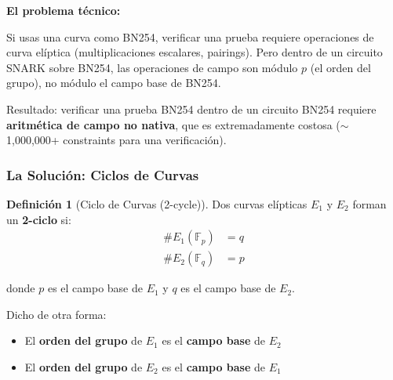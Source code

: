 \documentclass[11pt,a4paper,twoside,openright]{book}
\theoremstyle{definition}
\newtheorem{definition}{Definición}[chapter]
\theoremstyle{plain}
\theoremstyle{remark}
\begin{document}
\begin{advertencia}
\textbf{El problema técnico:}

Si usas una curva como BN254, verificar una prueba requiere operaciones de curva elíptica (multiplicaciones escalares, pairings). Pero dentro de un circuito SNARK sobre BN254, las operaciones de campo son módulo $p$ (el orden del grupo), no módulo el campo base de BN254.

Resultado: verificar una prueba BN254 dentro de un circuito BN254 requiere \textbf{aritmética de campo no nativa}, que es extremadamente costosa ($\sim$1,000,000+ constraints para una verificación).
\end{advertencia}

\subsubsection{La Solución: Ciclos de Curvas}

\begin{definition}[Ciclo de Curvas (2-cycle)]
Dos curvas elípticas $E_1$ y $E_2$ forman un \textbf{2-ciclo} si:
\begin{align}
\#E_1(\mathbb{F}_p) &= q \\
\#E_2(\mathbb{F}_q) &= p
\end{align}

donde $p$ es el campo base de $E_1$ y $q$ es el campo base de $E_2$.

Dicho de otra forma:
\begin{itemize}
    \item El \textbf{orden del grupo} de $E_1$ es el \textbf{campo base} de $E_2$
    \item El \textbf{orden del grupo} de $E_2$ es el \textbf{campo base} de $E_1$
\end{itemize}
\end{definition}

\begin{center}
\end{center}
\end{document}
